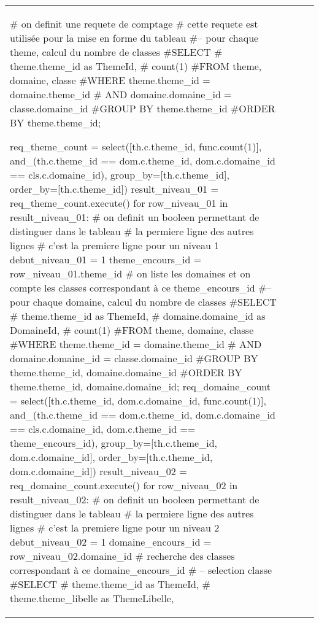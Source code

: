 \documentclass[12pt,titlepage]{book}
\begin{document}
\begin{supertabular}{|p{7.5cm}|p{7.5cm}|c|p{10cm}|}

\begin{lbdpython}

# on definit une requete de comptage
# cette requete est utilisée pour la mise en forme du tableau
#-- pour chaque theme, calcul du nombre de classes
#SELECT
#   theme.theme_id as ThemeId,
#   count(1)
#FROM theme, domaine, classe
#WHERE theme.theme_id = domaine.theme_id 
#  AND domaine.domaine_id = classe.domaine_id
#GROUP BY theme.theme_id
#ORDER BY theme.theme_id;

req_theme_count = select([th.c.theme_id, func.count(1)],
                  and_(th.c.theme_id == dom.c.theme_id,
                       dom.c.domaine_id == cls.c.domaine_id),
                  group_by=[th.c.theme_id],
                  order_by=[th.c.theme_id])
result_niveau_01 = req_theme_count.execute()
for row_niveau_01 in result_niveau_01:
   # on definit un booleen permettant de distinguer dans le tableau
   # la permiere ligne des autres lignes
   # c'est la premiere ligne pour un niveau 1
   debut_niveau_01 = 1
   theme_encours_id = row_niveau_01.theme_id
   # on liste les domaines et on compte les classes correspondant à ce theme_encours_id
   #-- pour chaque domaine, calcul du nombre de classes
   #SELECT
   #   theme.theme_id as ThemeId,
   #   domaine.domaine_id as DomaineId,
   #   count(1)
   #FROM theme, domaine, classe
   #WHERE theme.theme_id = domaine.theme_id 
   #  AND domaine.domaine_id = classe.domaine_id
   #GROUP BY theme.theme_id, domaine.domaine_id
   #ORDER BY theme.theme_id, domaine.domaine_id;
   req_domaine_count = select([th.c.theme_id, dom.c.domaine_id, func.count(1)],
                       and_(th.c.theme_id == dom.c.theme_id,
                            dom.c.domaine_id == cls.c.domaine_id,
                            dom.c.theme_id == theme_encours_id),
                       group_by=[th.c.theme_id, dom.c.domaine_id],
                       order_by=[th.c.theme_id, dom.c.domaine_id])
   result_niveau_02 = req_domaine_count.execute()
   for row_niveau_02 in result_niveau_02:
      # on definit un booleen permettant de distinguer dans le tableau
      # la permiere ligne des autres lignes
      # c'est la premiere ligne pour un niveau 2
      debut_niveau_02 = 1
      domaine_encours_id = row_niveau_02.domaine_id
      # recherche des classes correspondant à ce domaine_encours_id
      # -- selection classe
      #SELECT
      #   theme.theme_id as ThemeId,
      #   theme.theme_libelle as ThemeLibelle,

\end{lbdpython}
\end{supertabular}
\end{document}

